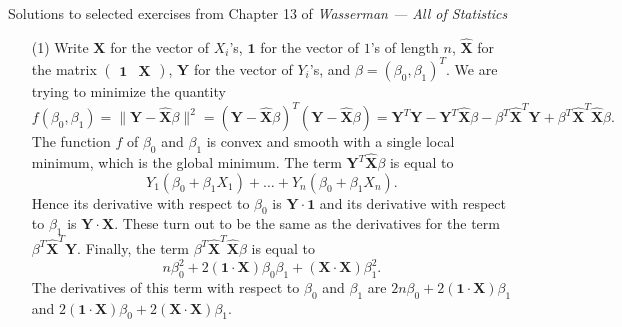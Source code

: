 \documentclass[10pt]{article}
\begin{document}
\noindent \large{Solutions to selected exercises from Chapter 13 of
\emph{Wasserman --- All of Statistics}}

\begin{enumerate}

\item[(1)] Write $\mathbf X$ for the vector of $X_i$'s, $\mathbf 1$ for the vector
of $1$'s of length $n$, $\hat{\mathbf X}$ for the matrix
$\begin{pmatrix}\mathbf 1 & \mathbf X\end{pmatrix}$, $\mathbf Y$ for the vector
of $Y_i$'s, and $\beta = (\beta_0,\beta_1)^T$. We are trying to minimize
the quantity
\[  f(\beta_0,\beta_1) =
    \|\mathbf Y - \hat{\mathbf X}\beta\|^2 =
    (\mathbf Y - \hat{\mathbf X}\beta)^T
    (\mathbf Y - \hat{\mathbf X}\beta) =
    \mathbf Y^T \mathbf Y - \mathbf Y^T \hat{\mathbf X}\beta
    - \beta^T \hat{\mathbf X}^T \mathbf Y
    + \beta^T \hat{\mathbf X}^T \hat{\mathbf X}\beta.
\]
The function $f$ of $\beta_0$ and $\beta_1$ is convex and smooth with a
single local minimum,
which is the global minimum. The term $\mathbf Y^T \hat{\mathbf X}\beta$ is equal
to
\[
    Y_1 (\beta_0 + \beta_1 X_1) + \ldots + Y_n(\beta_0 +\beta_1X_n).
\]
Hence its derivative with respect to $\beta_0$ is $\mathbf Y \cdot \mathbf 1$
and its derivative with respect to $\beta_1$ is $\mathbf Y \cdot \mathbf X$.
These turn out to be the same as the derivatives for the term
$\beta^T \hat{\mathbf X}^T \mathbf Y$. Finally, the term
$\beta^T \hat{\mathbf X}^T \hat{\mathbf X}\beta$ is equal to
\[
    n\beta_0^2 + 2(\mathbf 1 \cdot \mathbf X)\beta_0 \beta_1 +
    (\mathbf X \cdot \mathbf X)\beta_1^2.
\]
The derivatives of this term with respect to $\beta_0$ and $\beta_1$ are
$2n\beta_0 + 2(\mathbf 1 \cdot \mathbf X) \beta_1$ and
$2(\mathbf 1 \cdot \mathbf X)\beta_0+ 2(\mathbf X \cdot \mathbf X)\beta_1$.


\end{enumerate}
\end{document}
